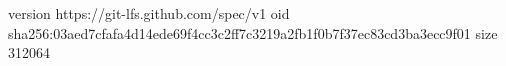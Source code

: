 version https://git-lfs.github.com/spec/v1
oid sha256:03aed7cfafa4d14ede69f4cc3c2ff7c3219a2fb1f0b7f37ec83cd3ba3ecc9f01
size 312064
